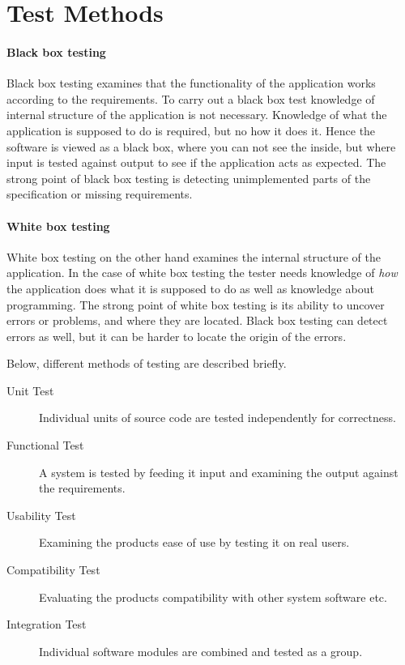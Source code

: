 \section{Test Methods}

\paragraph{Black box testing}

Black box testing examines that the functionality of the application works according to the requirements. To carry out a black box test knowledge of internal structure of the application is not necessary. Knowledge of what the application is supposed to do is required, but no how it does it. Hence the software is viewed as a black box, where you can not see the inside, but where input is tested against output to see if the application acts as expected. The strong point of black box testing is detecting unimplemented parts of the specification or missing requirements. \cite{whiteblacboxtesting}

\paragraph{White box testing}

White box testing on the other hand examines the internal structure of the application. In the case of white box testing the tester needs knowledge of \emph{how} the application does what it is supposed to do as well as knowledge about programming. The strong point of white box testing is its ability to uncover errors or problems, and where they are located. Black box testing can detect errors as well, but it can be harder to locate the origin of the errors. \cite{whiteblacboxtesting}

Below, different methods of testing are described briefly.

\begin{description}
  \item[Unit Test] Individual units of source code are tested independently for correctness. \cite{unitTesting}
  \item[Functional Test] A system is tested by feeding it input and examining the output against the requirements. \cite{functionalTesting}
  \item[Usability Test] Examining the products ease of use by testing it on real users. \cite{usabilityTesting}
  \item[Compatibility Test] Evaluating the products compatibility with other system software etc. \cite{compatibilityTesting}
  \item[Integration Test] Individual software modules are combined and tested as a group. \cite{integrationTesting}
\end{description}